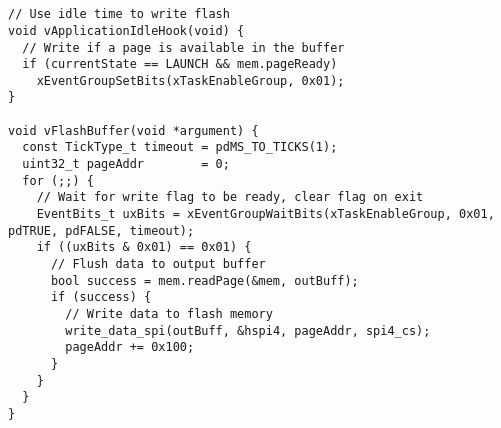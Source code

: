\renewcommand{\thechapter}{\Alph{chapter}}
\renewcommand{\thefigure}{\Alph{chapter}.\arabic{figure}}
\renewcommand{\chaptername}{Appendix}

\clearpage
\chapter{}\label{apdx:flash}
\begin{lstlisting}[caption={Flash task implementation}, captionpos=b]
// Use idle time to write flash
void vApplicationIdleHook(void) {
  // Write if a page is available in the buffer
  if (currentState == LAUNCH && mem.pageReady)
    xEventGroupSetBits(xTaskEnableGroup, 0x01);
}

void vFlashBuffer(void *argument) {
  const TickType_t timeout = pdMS_TO_TICKS(1);
  uint32_t pageAddr        = 0;
  for (;;) {
    // Wait for write flag to be ready, clear flag on exit
    EventBits_t uxBits = xEventGroupWaitBits(xTaskEnableGroup, 0x01, pdTRUE, pdFALSE, timeout);
    if ((uxBits & 0x01) == 0x01) {
      // Flush data to output buffer
      bool success = mem.readPage(&mem, outBuff); 
      if (success) {
        // Write data to flash memory
        write_data_spi(outBuff, &hspi4, pageAddr, spi4_cs);
        pageAddr += 0x100;
      }
    }
  }
}
\end{lstlisting}
